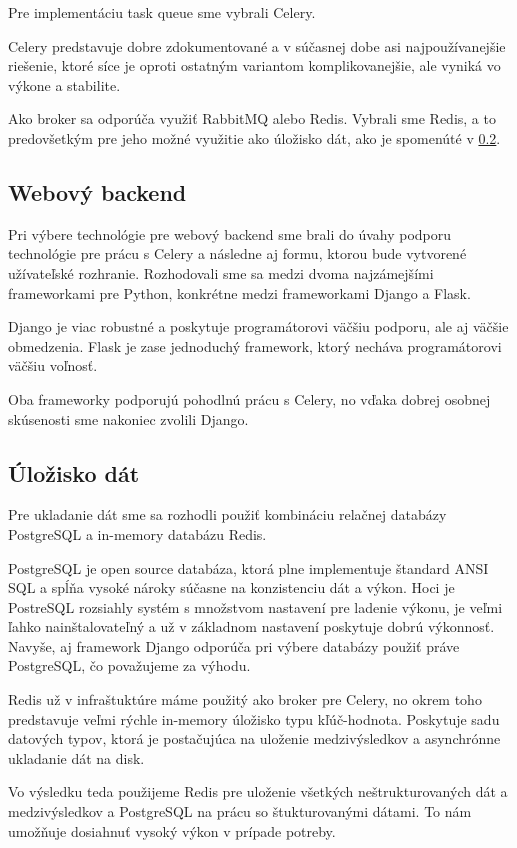 Pre implementáciu task queue sme vybrali Celery. 
\par Celery predstavuje dobre zdokumentované a v súčasnej dobe asi najpoužívanejšie riešenie, ktoré síce je oproti ostatným variantom komplikovanejšie, ale vyniká vo výkone a stabilite. 
\par Ako broker sa odporúča využiť RabbitMQ alebo Redis. Vybrali sme Redis, a to predovšetkým pre jeho možné využitie ako úložisko dát, ako je spomenúté v \ref{sec:store}.

\subsection{Webový backend}
Pri výbere technológie pre webový backend sme brali do úvahy podporu technológie pre prácu s Celery a následne aj formu, ktorou bude vytvorené užívateľské rozhranie. Rozhodovali sme sa medzi dvoma najzámejšími frameworkami pre Python, konkrétne medzi frameworkami Django a Flask.
\par Django je viac robustné a poskytuje programátorovi väčšiu podporu, ale aj väčšie obmedzenia. Flask je zase jednoduchý framework, ktorý necháva programátorovi väčšiu voľnosť.
\par Oba frameworky podporujú pohodlnú prácu s Celery, no vďaka dobrej osobnej skúsenosti sme nakoniec zvolili Django.

\subsection{Úložisko dát}
\label{sec:store}
Pre ukladanie dát sme sa rozhodli použiť kombináciu relačnej databázy PostgreSQL a in-memory databázu Redis. 
\par PostgreSQL je open source databáza, ktorá plne implementuje štandard ANSI SQL a spĺňa vysoké nároky súčasne na konzistenciu dát a výkon. Hoci je PostreSQL rozsiahly systém s množstvom nastavení pre ladenie výkonu, je veľmi ľahko nainštalovateľný a už v základnom nastavení poskytuje dobrú výkonnosť. Navyše, aj framework Django odporúča pri výbere databázy použiť práve PostgreSQL, čo považujeme za výhodu.
\par Redis už v infraštuktúre máme použitý ako broker pre Celery, no okrem toho predstavuje veľmi rýchle in-memory úložisko typu kľúč-hodnota. Poskytuje sadu datových typov, ktorá je postačujúca na uloženie medzivýsledkov a asynchrónne ukladanie dát na disk.
\par Vo výsledku teda použijeme Redis pre uloženie všetkých neštrukturovaných dát a medzivýsledkov a PostgreSQL na prácu so štukturovanými dátami. To nám umožňuje dosiahnuť vysoký výkon v prípade potreby.

